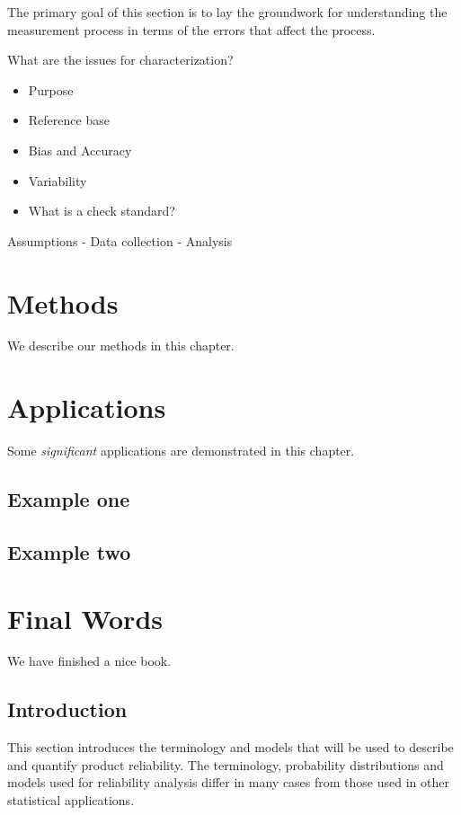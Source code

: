 \documentclass[]{book}
\providecommand{\tightlist}{%
  \setlength{\itemsep}{0pt}\setlength{\parskip}{0pt}}
\theoremstyle{definition}
\theoremstyle{definition}
\theoremstyle{definition}
\theoremstyle{remark}
\begin{document}
The primary goal of this section is to lay the groundwork for
understanding the measurement process in terms of the errors that affect
the process.

What are the issues for characterization?

\begin{itemize}
\tightlist
\item
  Purpose
\item
  Reference base
\item
  Bias and Accuracy
\item
  Variability
\item
  What is a check standard?
\end{itemize}

Assumptions - Data collection - Analysis

\chapter{Methods}\label{methods}

We describe our methods in this chapter.

\chapter{Applications}\label{applications}

Some \emph{significant} applications are demonstrated in this chapter.

\section{Example one}\label{example-one}

\section{Example two}\label{example-two}

\chapter{Final Words}\label{final-words}

We have finished a nice book.

\section{Introduction}\label{introduction}

This section introduces the terminology and models that will be used to
describe and quantify product reliability. The terminology, probability
distributions and models used for reliability analysis differ in many
cases from those used in other statistical applications.
\end{document}
